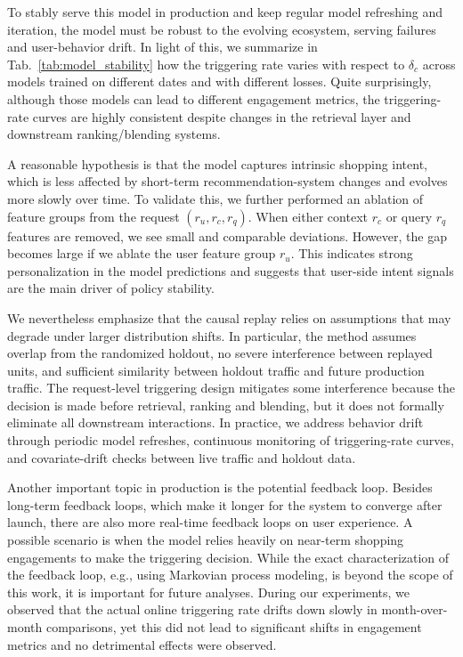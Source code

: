 \documentclass[sigconf, authorversion]{acmart}
\begin{document}
To stably serve this model in production and keep regular model refreshing and iteration, the model must be robust to the evolving ecosystem, serving failures and user-behavior drift. In light of this, we summarize in Tab.~\ref{tab:model_stability} how the triggering rate varies with respect to $\delta_c$ across models trained on different dates and with different losses. Quite surprisingly, although those models can lead to different engagement metrics, the triggering-rate curves are highly consistent despite changes in the retrieval layer and downstream ranking/blending systems.

A reasonable hypothesis is that the model captures intrinsic shopping intent, which is less affected by short-term recommendation-system changes and evolves more slowly over time. To validate this, we further performed an ablation of feature groups from the request $(r_u, r_c, r_q)$. When either context $r_c$ or query $r_q$ features are removed, we see small and comparable deviations. However, the gap becomes large if we ablate the user feature group $r_u$. This indicates strong personalization in the model predictions and suggests that user-side intent signals are the main driver of policy stability.

We nevertheless emphasize that the causal replay relies on assumptions that may degrade under larger distribution shifts. In particular, the method assumes overlap from the randomized holdout, no severe interference between replayed units, and sufficient similarity between holdout traffic and future production traffic. The request-level triggering design mitigates some interference because the decision is made before retrieval, ranking and blending, but it does not formally eliminate all downstream interactions. In practice, we address behavior drift through periodic model refreshes, continuous monitoring of triggering-rate curves, and covariate-drift checks between live traffic and holdout data.

Another important topic in production is the potential feedback loop. Besides long-term feedback loops, which make it longer for the system to converge after launch, there are also more real-time feedback loops on user experience. A possible scenario is when the model relies heavily on near-term shopping engagements to make the triggering decision. While the exact characterization of the feedback loop, e.g., using Markovian process modeling, is beyond the scope of this work, it is important for future analyses. During our experiments, we observed that the actual online triggering rate drifts down slowly in month-over-month comparisons, yet this did not lead to significant shifts in engagement metrics and no detrimental effects were observed.
\end{document}
